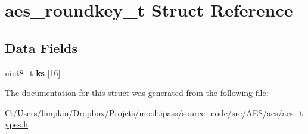 \hypertarget{structaes__roundkey__t}{\section{aes\-\_\-roundkey\-\_\-t Struct Reference}
\label{structaes__roundkey__t}
}
\subsection*{Data Fields}
\begin{DoxyCompactItemize}
\item 
\hypertarget{structaes__roundkey__t_a9289449e3402751c6996e0c14c3750b8}{uint8\-\_\-t {\bfseries ks} \mbox{[}16\mbox{]}}\label{structaes__roundkey__t_a9289449e3402751c6996e0c14c3750b8}

\end{DoxyCompactItemize}


The documentation for this struct was generated from the following file\-:\begin{DoxyCompactItemize}
\item 
C\-:/\-Users/limpkin/\-Dropbox/\-Projets/mooltipass/source\-\_\-code/src/\-A\-E\-S/aes/\hyperlink{aes__types_8h}{aes\-\_\-types.\-h}\end{DoxyCompactItemize}
